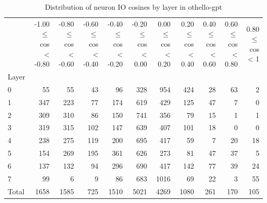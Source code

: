 \begin{table}
\caption{Distribution of neuron IO cosines by layer in othello-gpt}
\label{tab:othello-gpt_half_coarse}
\begin{tabular}{lrrrrrrrrrr}
 & -1.00 $\leq$ cos < -0.80 & -0.80 $\leq$ cos < -0.60 & -0.60 $\leq$ cos < -0.40 & -0.40 $\leq$ cos < -0.20 & -0.20 $\leq$ cos < 0.00 & 0.00 $\leq$ cos < 0.20 & 0.20 $\leq$ cos < 0.40 & 0.40 $\leq$ cos < 0.60 & 0.60 $\leq$ cos < 0.80 & 0.80 $\leq$ cos < 1 \\
Layer &  &  &  &  &  &  &  &  &  &  \\
0 & 55 & 55 & 43 & 96 & 328 & 954 & 424 & 28 & 63 & 2 \\
1 & 347 & 223 & 77 & 174 & 619 & 429 & 125 & 47 & 7 & 0 \\
2 & 309 & 310 & 86 & 150 & 741 & 356 & 79 & 15 & 1 & 1 \\
3 & 319 & 315 & 102 & 147 & 639 & 407 & 101 & 18 & 0 & 0 \\
4 & 238 & 275 & 119 & 200 & 695 & 417 & 59 & 7 & 20 & 18 \\
5 & 154 & 269 & 195 & 361 & 626 & 273 & 81 & 47 & 37 & 5 \\
6 & 137 & 132 & 94 & 296 & 690 & 417 & 142 & 77 & 39 & 24 \\
7 & 99 & 6 & 9 & 86 & 683 & 1016 & 69 & 22 & 3 & 55 \\
Total & 1658 & 1585 & 725 & 1510 & 5021 & 4269 & 1080 & 261 & 170 & 105 \\
\end{tabular}
\end{table}
